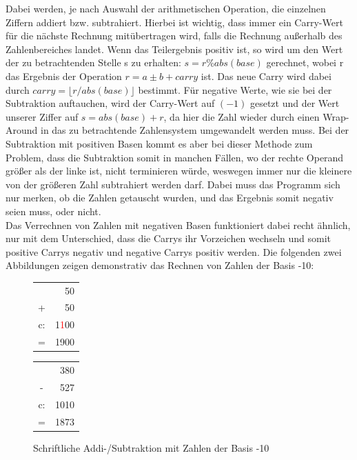 \documentclass[course=erap]{aspdoc}
\begin{document}
    Dabei werden, je nach Auswahl der arithmetischen Operation, die einzelnen Ziffern addiert bzw. subtrahiert.
    Hierbei ist wichtig, dass immer ein Carry-Wert für die nächste Rechnung
    mitübertragen wird, falls die Rechnung außerhalb des Zahlenbereiches landet. Wenn das Teilergebnis positiv ist,
    so wird um den Wert der zu betrachtenden Stelle s zu erhalten: $s = r \% abs(base)$ gerechnet, wobei r das Ergebnis
    der Operation $r = a \pm b + carry$ ist. Das neue Carry wird dabei durch $carry = \lfloor r/abs(base) \rfloor$ bestimmt.
    Für negative Werte, wie sie bei der Subtraktion auftauchen, wird der Carry-Wert auf $(-1)$ gesetzt
    und der Wert unserer Ziffer auf $s = abs(base) + r$, da hier die Zahl wieder durch einen Wrap-Around
    in das zu betrachtende Zahlensystem umgewandelt werden muss. Bei der Subtraktion mit positiven Basen
    kommt es aber bei dieser Methode zum Problem, dass die Subtraktion somit in manchen Fällen, wo der rechte Operand größer
    als der linke ist, nicht terminieren würde, weswegen immer nur die kleinere von der größeren Zahl subtrahiert werden darf.
    Dabei muss das Programm sich nur merken, ob die Zahlen getauscht wurden, und das Ergebnis somit negativ seien muss,
    oder nicht. \\
    \newline
    Das Verrechnen von Zahlen mit negativen Basen funktioniert dabei recht ähnlich, nur mit dem Unterschied, dass
    die Carrys ihr Vorzeichen wechseln und somit positive Carrys negativ und negative Carrys positiv werden. Die folgenden
    zwei Abbildungen zeigen demonstrativ das Rechnen von Zahlen der Basis -10:

    \begin{figure}[ht]
        \centering
        \captionsetup{justification=centering}
        \begin{center}
            \begin{tabular}{cr}
                & 50                   \\
                +  & 50                   \\\hline
                c: & 1\textcolor{red}{1}00 \\\hline
                =  & 1900
            \end{tabular}
            \qquad \qquad \qquad
            \begin{tabular}{cr}
                & 380  \\
                -  & 527  \\\hline
                c: & 1010 \\\hline
                =  & 1873
            \end{tabular}
        \end{center}
        \caption{Schriftliche Addi-/Subtraktion mit Zahlen der Basis -10}
    \end{figure}
\end{document}
